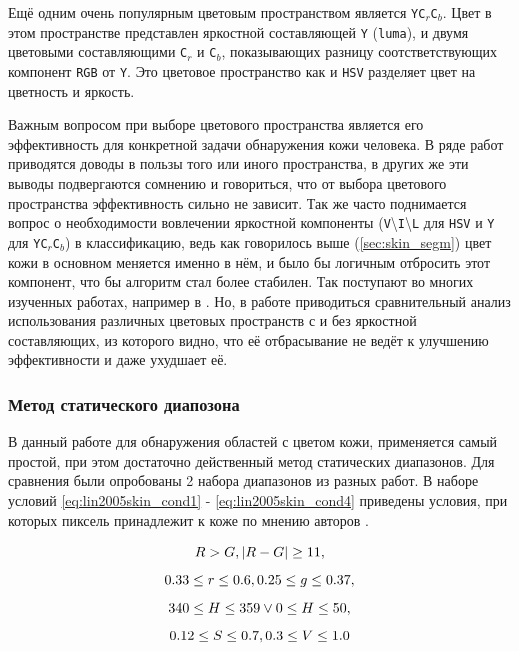 \documentclass[12pt]{report}
\begin{document}
Ещё одним очень популярным цветовым пространством является \texttt{YC$_r$C$_b$}. Цвет в этом пространстве представлен яркостной составляющей \texttt{Y} (\texttt{luma}), и двумя цветовыми составляющими \texttt{C$_r$} и \texttt{C$_b$}, показывающих разницу соотстветствующих компонент \texttt{RGB} от \texttt{Y}. Это цветовое пространство как и \texttt{HSV} разделяет цвет на цветность и яркость. \citep{vezhnevets2003survey}

Важным вопросом при выборе цветового пространства является его эффективность для конкретной задачи обнаружения кожи человека. В ряде работ приводятся доводы в пользы того или иного пространства, в других же эти выводы подвергаются сомнению и говориться, что от выбора цветового пространства эффективность сильно не зависит. Так же часто поднимается вопрос о необходимости вовлечении яркостной компоненты (\texttt{V}\textbackslash{}\texttt{I}\textbackslash{}\texttt{L} для \texttt{HSV} и \texttt{Y} для \texttt{YC$_r$C$_b$}) в классификацию, ведь как говорилось выше (\ref{sec:skin_segm}) цвет кожи в основном меняется именно в нём, и было бы логичным отбросить этот компонент, что бы алгоритм стал более стабилен. Так поступают во многих изученных работах, например в \citep{mohamed2008face}. Но, в работе \citep{xu2006color} приводиться сравнительный анализ использования различных цветовых пространств с и без яркостной составляющих, из которого видно, что её отбрасывание не ведёт к улучшению эффективности и даже ухудшает её.

\subsubsection{Метод статического диапозона}
В данный работе для обнаружения областей с цветом кожи, применяется самый простой, при этом достаточно действенный метод статических диапазонов. Для сравнения были опробованы 2 набора диапазонов из разных работ. В наборе условий \ref{eq:lin2005skin_cond1} - \ref{eq:lin2005skin_cond4} приведены условия, при которых пиксель принадлежит к коже по мнению авторов \citep{lin2005face}.

\begin{equation}
\label{eq:lin2005skin_cond1}
\centering
R>G, |R-G|\geq{11}, 
\end{equation}
\begin{equation}
\label{eq:lin2005skin_cond2}
\centering
0.33\leq{r}\leq{0.6}, 0.25\leq{g}\leq{0.37},
\end{equation}
\begin{equation}
\label{eq:lin2005skin_cond3}
\centering
340\leq{H}\leq{359} \lor 0\leq{H}\leq{50},
\end{equation}
\begin{equation}
\label{eq:lin2005skin_cond4}
\centering
0.12\leq{S}\leq{0.7}, 0.3\leq{V}\leq{1.0}
\end{equation}
\end{document}
